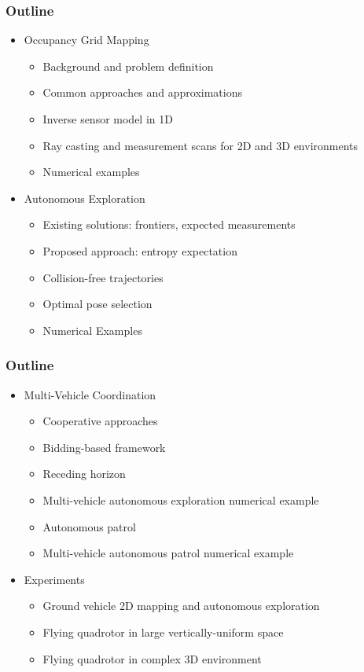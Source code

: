 \documentclass[11pt,professionalfonts,hyperref={pdftex,pdfpagemode=none,pdfstartview=FitH}]{beamer}
\begin{document}
\begin{frame}
\frametitle{Outline}
\begin{itemize}
	\item Occupancy Grid Mapping
	\begin{itemize}
		\item Background and problem definition
		\item Common approaches and approximations
		\item Inverse sensor model in 1D
		\item Ray casting and measurement scans for 2D and 3D environments
		\item Numerical examples
	\end{itemize}
	\pause
	\item Autonomous Exploration
	\begin{itemize}
		\item Existing solutions: frontiers, expected measurements
		\item Proposed approach: entropy expectation
		\item Collision-free trajectories
		\item Optimal pose selection
		\item Numerical Examples
	\end{itemize}
\end{itemize}
\end{frame}

\begin{frame}
\frametitle{Outline}
\begin{itemize}
	\item Multi-Vehicle Coordination
	\begin{itemize}
		\item Cooperative approaches
		\item Bidding-based framework
		\item Receding horizon
		\item Multi-vehicle autonomous exploration numerical example
		\item Autonomous patrol
		\item Multi-vehicle autonomous patrol numerical example
	\end{itemize}
	\pause
	\item Experiments
	\begin{itemize}
		\item Ground vehicle 2D mapping and autonomous exploration
		\item Flying quadrotor in large vertically-uniform space
		\item Flying quadrotor in complex 3D environment
	\end{itemize}
\end{itemize}
\end{frame}
\end{document}
